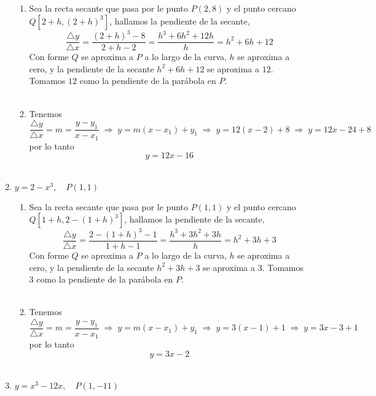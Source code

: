 \begin{enumerate}
\begin{enumerate}[\bfseries a)]
    
    \item Sea la recta secante que pasa por le punto $P(2,8)$  y el punto cercano $Q\left[2+h, (2+h)^3 \right]$, hallamos la pendiente de la secante, $$\dfrac{\triangle y}{\triangle x} = \dfrac{(2+h)^3 - 8}{2+h - 2} = \dfrac{h^3 + 6h^2 + 12h}{h} = h^2+6h+12$$
    Con forme $Q$ se aproxima a $P$ a lo largo de la curva, $h$ se aproxima a cero, y la pendiente de la secante $h^2 + 6h + 12$ se aproxima a $12$. Tomamos $12$ como la pendiente de la parábola en $P$.\\\\

    \item Tenemos $$\dfrac{\triangle y}{\triangle x} = m = \dfrac{y - y_1}{x - x_1} \; \Longrightarrow \; y = m(x-x_1) + y_1\; \Longrightarrow \; y = 12(x-2) + 8 \; \Longrightarrow \; y = 12x - 24 + 8$$ por lo tanto $$y = 12x-16$$\\

\end{enumerate}

\item $y=2-x^3, \quad P(1,1)$

\begin{enumerate}[\bfseries a)]
    
    \item Sea la recta secante que pasa por le punto $P(1,1)$  y el punto cercano $Q\left[1+h, 2-(1+h)^3 \right]$, hallamos la pendiente de la secante, $$\dfrac{\triangle y}{\triangle x} = \dfrac{2-(1+h)^3 - 1}{1+h - 1} = \dfrac{h^3 + 3h^2 + 3h}{h} = h^2+3h+3$$
    Con forme $Q$ se aproxima a $P$ a lo largo de la curva, $h$ se aproxima a cero, y la pendiente de la secante $h^2 + 3h + 3$ se aproxima a $3$. Tomamos $3$ como la pendiente de la parábola en $P$.\\\\

    \item Tenemos $$\dfrac{\triangle y}{\triangle x} = m = \dfrac{y - y_1}{x - x_1} \; \Longrightarrow \; y = m(x-x_1) + y_1\; \Longrightarrow \; y = 3(x-1) + 1 \; \Longrightarrow \; y = 3x - 3 + 1$$ por lo tanto $$y = 3x-2$$\\

\end{enumerate}

\item $y=x^3 - 12x, \quad P(1,-11)$


\end{enumerate}
